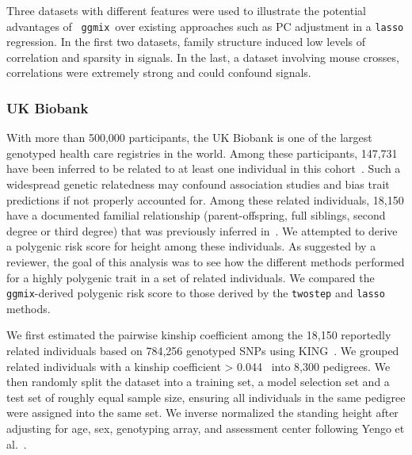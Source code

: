 \documentclass[12pt,letter]{article}\usepackage[]{graphicx}\usepackage[]{color}
\newcommand{\ggmix}{\texttt{ggmix}}
\begin{document}
Three datasets with different features were used to illustrate the potential advantages of ~\ggmix ~over existing approaches such as PC adjustment in a \texttt{lasso} regression. In the first two datasets, family structure induced low levels of correlation and sparsity in signals. In the last, a dataset involving mouse crosses, correlations were extremely strong and could confound signals.

\subsubsection{UK Biobank} \label{subsubsec:UKB}

With more than 500,000 participants, the UK Biobank is one of the largest genotyped health care registries in the world. Among these participants, 147,731 have been inferred to be related to at least one individual in this cohort~\citep{bycroft2018uk}. Such a widespread genetic relatedness may confound association studies and bias trait predictions if not properly accounted for. Among these related individuals, 18,150 have a documented familial relationship (parent-offspring, full siblings, second degree or third degree) that was previously inferred in~\citep{biobank2015genotyping}. We attempted to derive a polygenic risk score for height among these individuals. As suggested by a reviewer, the goal of this analysis was to see how the different methods performed for a highly polygenic trait in a set of related individuals. We compared the \ggmix-derived polygenic risk score to those derived by the \texttt{twostep} and \texttt{lasso} methods.

We first estimated the pairwise kinship coefficient among the 18,150 reportedly related individuals based on 784,256 genotyped SNPs using KING~\citep{manichaikul2010robust}. We grouped related individuals with a kinship coefficient > 0.044~\citep{manichaikul2010robust} into 8,300 pedigrees. We then randomly split the dataset into a training set, a model selection set and a test set of roughly equal sample size, ensuring all individuals in the same pedigree were assigned into the same set. We inverse normalized the standing height after adjusting for age, sex, genotyping array, and assessment center following Yengo et al.~\citep{yengo2018meta}. 
\end{document}
